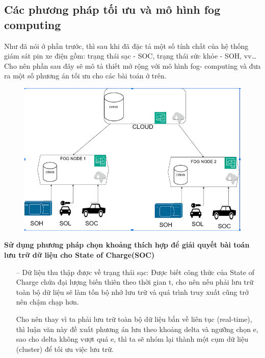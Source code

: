 \documentclass[a4paper,13pt]{article}
\theoremstyle{mytheor}
\begin{document}
\subsection{Các phương pháp tối ưu và mô hình fog computing}
Như đã nói ở phần trước, thì sau khi đã đặc tả một số tính chất của hệ thống giám sát pin xe điện gồm: trạng thái sạc - SOC, trạng thái sức khỏe - SOH, vv… Cho nên phần sau đây sẽ mô tả thiết mở rộng với mô hình fog- computing và đưa ra một số phương án tối ưu cho các bài toán ở trên. 
\vspace{10cm}
\begin{figure}
    \centering
    \includegraphics{fog-computing.png}
    \label{fig:enter-label}
\end{figure}
\vspace{5cm}

\textbf{Sử dụng phương pháp chọn khoảng thích hợp để giải quyết bài toán lưu trữ dữ liệu cho State of Charge(SOC) }
\begin{itemize}
    \item[--] Dữ liệu thu thập được về trạng thái sạc: Được biết công thức của State of Charge chứa đại lượng biến thiên theo thời gian t, cho nên nếu phải lưu trữ toàn bộ dữ liệu sẽ làm tốn bộ nhớ lưu trữ và quá trình truy xuất cũng trở nên chậm chạp hơn. 

    Cho nên thay vì ta phải lưu trữ toàn bộ dữ liệu bắn về liên tục (real-time), thì luận văn này đề xuất phương án lưu theo khoảng delta và ngưỡng chọn e, sao cho delta không vượt quá e, thì ta sẽ nhóm lại thành một cụm dữ liệu (cluster) để tối ưu việc lưu trữ.
    
\end{itemize}
\end{document}
